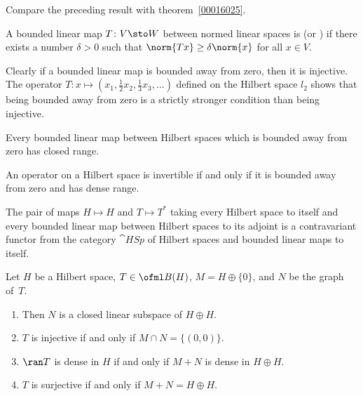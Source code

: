 Compare the preceding result with theorem~\ref{00016025}.

\begin{defn}\label{def_bdd_away_zero} A bounded linear map $T \colon V \sto W$ between normed linear spaces is
 (or
) if there exists a number $\delta > 0$ such that $\norm{Tx} \ge \delta\norm{x}$ for all $x \in V$.
\end{defn}

\begin{exam} Clearly if a bounded linear map is bounded away from zero, then it is injective. The operator
$T\colon x \mapsto (x_1, \frac12 x_2, \frac13 x_3, \dots)$ defined on the Hilbert space $l_2$ shows that being bounded
away from zero is a strictly stronger condition than being injective.
\end{exam}

\begin{prop}\label{prop_bafz_closed_rng} Every bounded linear map between Hilbert spaces which is bounded away from
zero has closed range.
\end{prop}

\begin{prop}\label{prop_nasc_op_invert} An operator on a Hilbert space is invertible if and only if
it is bounded away from zero and has dense range.
\end{prop}

\begin{prop} The pair of maps $H \mapsto H$ and $T \mapsto T^*$ taking every Hilbert space to
itself and every bounded linear map between Hilbert spaces to its adjoint is a contravariant functor
from the category $\cat{HSp}$ of Hilbert spaces and bounded linear maps to itself.
\end{prop}

\begin{prop} Let $H$ be a Hilbert space, $T \in \ofml B(H)$, $M = H \oplus \{0\}$, and $N$ be the graph of~$T$.
 \begin{enumerate}[label=\rm{(\alph*)}]
  \item Then $N$ is a closed linear subspace of $H \oplus H$.
  \item $T$ is injective if and only if $M \cap N = \{(0,0)\}$.
  \item $\ran T$ is dense in $H$ if and only if $M + N$ is dense in $H \oplus H$.
  \item $T$ is surjective if and only if $M + N = H \oplus H$.
 \end{enumerate}
\end{prop}

